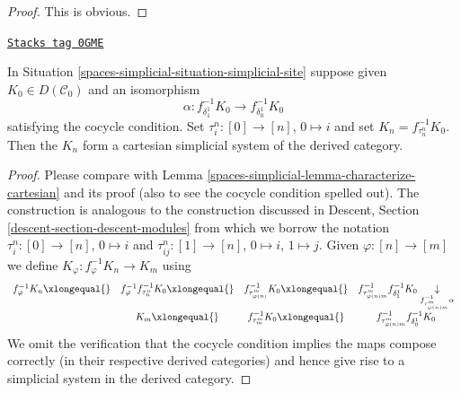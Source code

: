 \begin{proof}
This is obvious.
\end{proof}

\begin{lemma}
\label{spaces-simplicial-lemma-construct-cartesian-objects-derived}
\href{https://stacks.math.columbia.edu/tag/0GME}{\texttt{Stacks tag 0GME}}

In Situation \ref{spaces-simplicial-situation-simplicial-site}
suppose given $K_0 \in D(\mathcal{C}_0)$ and an isomorphism
$$
\alpha :
f_{\delta_1^1}^{-1}K_0
\longrightarrow
f_{\delta_0^1}^{-1}K_0
$$
satisfying the cocycle condition. Set
$\tau^n_i : [0] \to [n]$, $0 \mapsto i$ and
set $K_n = f_{\tau^n_n}^{-1}K_0$. Then the $K_n$
form a cartesian simplicial system of the derived category.
\end{lemma}

\begin{proof}
Please compare with Lemma \ref{spaces-simplicial-lemma-characterize-cartesian}
and its proof (also to see the cocycle condition spelled out).
The construction is analogous to the construction discussed in
Descent, Section \ref{descent-section-descent-modules} from which
we borrow the notation $\tau^n_i : [0] \to [n]$, $0 \mapsto i$ and
$\tau^n_{ij} : [1] \to [n]$, $0 \mapsto i$, $1 \mapsto j$.
Given $\varphi : [n] \to [m]$ we define
$K_\varphi : f_\varphi^{-1}K_n \to K_m$
using
$$
\begin{array}{cccc}f_\varphi^{-1}K_n \xlongequal{} & f_\varphi^{-1} f_{\tau^n_n}^{-1}K_0 \xlongequal{} & f_{\tau^m_{\varphi(n)}}^{-1}K_0 \xlongequal{} & f_{\tau^m_{\varphi(n)m}}^{-1}f_{\delta^1_1}^{-1}K_0
\underset{f_{\tau^m_{\varphi(n)m}}^{-1}\alpha}{\downarrow} \\  & K_m \xlongequal{} & f_{\tau^m_m}^{-1}K_0 \xlongequal{} & f_{\tau^m_{\varphi(n)m}}^{-1}f_{\delta^1_0}^{-1}K_0\end{array}
$$
We omit the verification that the cocycle condition
implies the maps compose correctly (in their respective
derived categories) and hence give rise to a
simplicial system in the derived category.
\end{proof}

